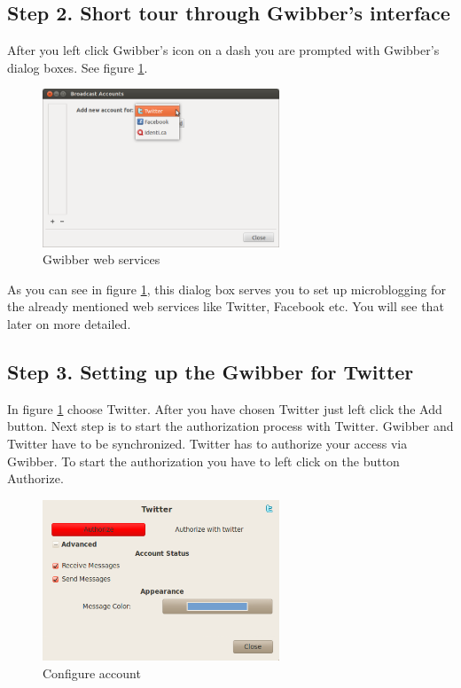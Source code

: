 \subsection*{Step 2.  Short tour through Gwibber's interface}

\par \noindent After you left click Gwibber's icon on a dash you are prompted with Gwibber's dialog boxes. See figure \ref{fig:gwibber2}. \\

\begin{figure}[h!]	
	\centering
	\includegraphics[width=200pt]{./images/basic-tasks/gwibber2.png}
	\caption{Gwibber web services}	
	\label{fig:gwibber2}		
\end{figure}

\par \noindent As you can see in figure \ref{fig:gwibber2},  this dialog box serves you to set up microblogging for the already mentioned web services like Twitter, Facebook etc. You will see that later on more detailed. 

\subsection*{Step 3.  Setting up the Gwibber for Twitter}

In figure \ref{fig:gwibber2} choose Twitter.  After you have chosen Twitter just left click the Add button. Next step is to start the authorization process with Twitter. Gwibber and Twitter have to be synchronized. Twitter has to authorize your access via Gwibber. To start the authorization you have to left click on the button Authorize. \\

\begin{figure}[h!]	
	\centering
	\includegraphics[width=200pt]{./images/basic-tasks/gwibber3.png}
	\caption{Configure account}	
	\label{fig:gwibber3}		
\end{figure}

